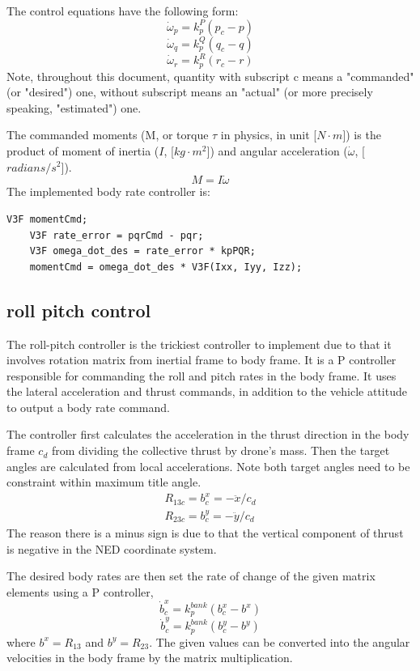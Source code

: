 \documentclass[a4paper]{article}
\begin{document}
The control equations have the following form:
$$ \dot{\omega}_{p} = k_{p}^{P} (p_c - p) $$
$$ \dot{\omega}_{q} = k_{p}^{Q} (q_c - q) $$
$$ \dot{\omega}_{r} = k_{p}^{R} (r_c - r) $$
Note, throughout this document, quantity with subscript c means a "commanded" (or "desired") one, without subscript means an "actual" (or more precisely speaking, "estimated") one.

The commanded moments (M, or torque $\tau$ in physics, in unit [$N \cdot m$]) is the product of moment of inertia ($I$, [$kg \cdot m^2$]) and angular acceleration ($\dot{\omega}$, [$radians/s^2$]).
$$ M = I \dot{\omega} $$
The implemented body rate controller is:

\begin{lstlisting}[frame=single]
	V3F momentCmd;
	V3F rate_error = pqrCmd - pqr;
	V3F omega_dot_des = rate_error * kpPQR;
	momentCmd = omega_dot_des * V3F(Ixx, Iyy, Izz);
\end{lstlisting}

\subsection{roll pitch control} \label{control:rollpitch}
The roll-pitch controller is the trickiest controller to implement due to that it involves rotation matrix from inertial frame to body frame. It is a P controller responsible for commanding the roll and pitch rates in the body frame. It uses the lateral acceleration and thrust commands, in addition to the vehicle attitude to output a body rate command. 

The controller first calculates the acceleration in the thrust direction in the body frame $c_d$ from dividing the collective thrust by drone's mass. Then the target angles are calculated from local accelerations. Note both target angles need to be constraint within maximum title angle.
\begin{gather*}
R_{13c} = b^x_c = - \ddot{x} / c_d \\
R_{23c} = b^y_c = - \ddot{y} / c_d
\end{gather*}
The reason there is a minus sign is due to that the vertical component of thrust is negative in the NED coordinate system.

The desired body rates are then set the rate of change of the given matrix elements using a P controller,
$$\dot{b}^x_c  = k_p^{bank}(b^x_c - b^x)$$
$$\dot{b}^y_c  = k_p^{bank}(b^y_c - b^y)$$
where $b^x = R_{13}$ and $b^y = R_{23}$. The given values can be converted into the angular velocities in the body frame by the matrix multiplication. 
\end{document}
